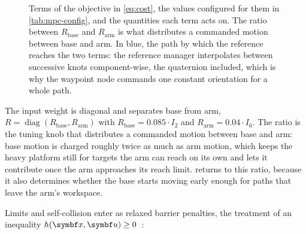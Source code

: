 \begin{figure}[htbp]
  \caption[Structure of the \ocs{} objective on \hero{}]{%
    Terms of the objective in \cref{eq:cost}, the values configured for
    them in \cref{tab:mpc-config}, and the quantities each term acts on.
    The ratio between $R_\mathrm{base}$ and $R_\mathrm{arm}$ is what
    distributes a commanded \ee{} motion between base and arm. In blue,
    the path by which the reference reaches the two \ee{} terms: the
    reference manager interpolates between successive knots
    component-wise, the quaternion included, which is why the waypoint
    node commands one constant orientation for a whole path.}
  \label{fig:cost-structure}
\end{figure}

The input weight is diagonal and separates base from arm,
$R = \operatorname{diag}(R_\mathrm{base}, R_\mathrm{arm})$ with
$R_\mathrm{base} = 0.085 \cdot I_2$ and
$R_\mathrm{arm} = 0.04 \cdot I_6$. The ratio is the tuning knob that
distributes a commanded \ee{} motion between base and arm: base motion
is charged roughly twice as much as arm motion, which keeps the heavy
platform still for targets the arm can reach on its own and lets it
contribute once the arm approaches its reach limit. 
returns to this ratio, because it also determines whether the base
starts moving early enough for paths that leave the arm's workspace.

Limits and self-collision enter as relaxed barrier penalties, the
\ocs{} treatment of an inequality
$h(\svec,\uvec) \ge 0$~\cite{Feller2017RelaxedBarrier,ocs2Toolbox}:

